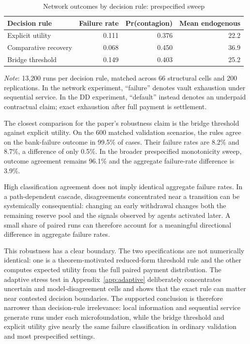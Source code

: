 \documentclass[12pt]{article}\usepackage[]{graphicx}\usepackage[]{xcolor}
\begin{document}
\begin{table}[ht]
\centering
\small
\caption{Network outcomes by decision rule: prespecified sweep}
\label{tab:network_rules}

\begin{tabular}{lrrr}
\toprule
Decision rule & Failure rate & Pr(contagion) & Mean endogenous\\
\midrule
Explicit utility & 0.111 & 0.376 & 22.2\\
Comparative recovery & 0.068 & 0.450 & 36.9\\
Bridge threshold & 0.149 & 0.403 & 25.2\\
\bottomrule
\end{tabular}


\smallskip

\small\textit{Note}: 13{,}200 runs per decision rule, matched across
66 structural cells and 200 replications. In the network experiment,
``failure'' denotes vault exhaustion under sequential service. In the
DD experiment, ``default'' instead denotes an underpaid contractual
claim; exact exhaustion after full payment is settlement.
\end{table}

The closest comparison for the paper's robustness claim is the bridge threshold against explicit utility.
On the 600 matched validation scenarios, the rules agree on the bank-failure outcome in 99.5\% of cases.
Their failure rates are 8.2\% and 8.7\%, a difference of only 0.5\%.
In the broader prespecified monotonicity sweep, outcome agreement remains 96.1\% and the aggregate failure-rate difference is 3.9\%.

High classification agreement does not imply identical aggregate failure rates.
In a path-dependent cascade, disagreements concentrated near a transition can be systemically consequential: changing an early withdrawal changes both the remaining reserve pool and the signals observed by agents activated later.
A small share of paired runs can therefore account for a meaningful directional difference in aggregate failure rates.

This robustness has a clear boundary.
The two specifications are not numerically identical: one is a theorem-motivated reduced-form threshold rule and the other computes expected utility from the full paired payment distribution.
The adaptive stress test in Appendix~\ref{app:adaptive} deliberately concentrates uncertain and model-disagreement cells and shows that the exact rule can matter near contested decision boundaries.
The supported conclusion is therefore narrower than decision-rule irrelevance: local information and sequential service generate runs under each microfoundation, while the bridge threshold and explicit utility give nearly the same failure classification in ordinary validation and most prespecified settings.
\end{document}
